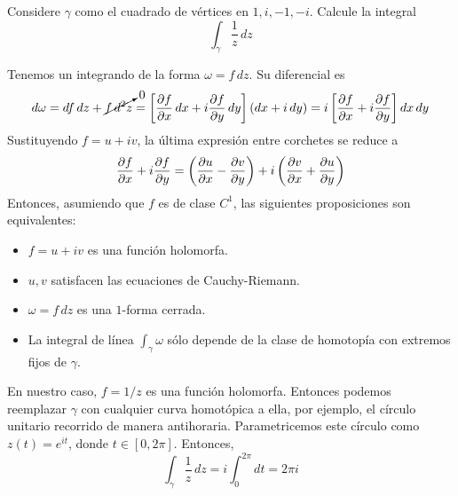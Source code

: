 \begin{exercise}
Considere $\gamma$ como el cuadrado de vértices en $1, i, -1, -i$. Calcule la integral
$$\int_\gamma \frac 1z \, dz$$
\end{exercise}

\begin{solution}
Tenemos un integrando de la forma $\omega = f \, dz$. Su diferencial es
$$
d\omega
    = df \, dz + \cancelto 0 {f \, d^2z}
    = \left[ \dfrac {\partial f} {\partial x} \, dx + i \dfrac {\partial f} {\partial y} \, dy \right] (dx + i \, dy)
    = i \left[ \dfrac {\partial f} {\partial x} + i \dfrac {\partial f} {\partial y} \right] dx \, dy
$$
Sustituyendo $f = u + iv$, la última expresión entre corchetes se reduce a
$$\dfrac {\partial f} {\partial x} + i \dfrac {\partial f} {\partial y} = \left( \dfrac {\partial u} {\partial x} - \dfrac {\partial v} {\partial y} \right) + i \left( \dfrac {\partial v} {\partial x} + \dfrac {\partial u} {\partial y} \right)$$
Entonces, asumiendo que $f$ es de clase $C^1$, las siguientes proposiciones son equivalentes:
\begin{itemize}
    \item $f = u + iv$ es una función holomorfa.
    \item $u, v$ satisfacen las ecuaciones de Cauchy-Riemann.
    \item $\omega = f \, dz$ es una $1$-forma cerrada.
    \item La integral de línea $\int_\gamma \omega$ sólo depende de la clase de homotopía con extremos fijos de $\gamma$.
\end{itemize}
En nuestro caso, $f = 1/z$ es una función holomorfa. Entonces podemos reemplazar $\gamma$ con cualquier curva homotópica a ella, por ejemplo, el círculo unitario recorrido de manera antihoraria. Parametricemos este círculo como $z(t) = e^{it}$, donde $t \in [0, 2\pi]$. Entonces,
$$\int_\gamma \frac 1z \, dz = i \int_0^{2\pi} dt = 2\pi i$$
\end{solution}
